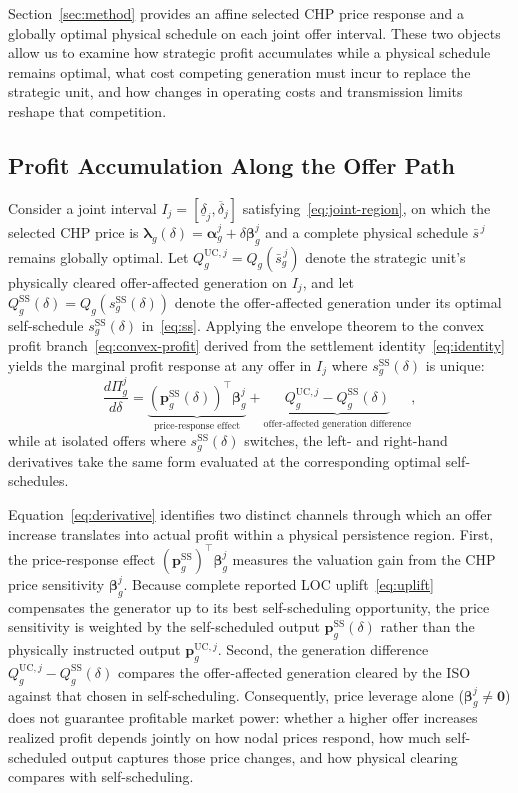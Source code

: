 \documentclass[journal]{IEEEtran}
\newcommand{\bp}{\bm p}
\newcommand{\blambda}{\bm\lambda}
\newcommand{\UC}{\mathrm{UC}}
\newcommand{\SSched}{\mathrm{SS}}
\begin{document}
Section~\ref{sec:method} provides an affine selected CHP price response and a globally optimal physical schedule on each joint offer interval. These two objects allow us to examine how strategic profit accumulates while a physical schedule remains optimal, what cost competing generation must incur to replace the strategic unit, and how changes in operating costs and transmission limits reshape that competition.

\subsection{Profit Accumulation Along the Offer Path}

Consider a joint interval $I_j=[\underline{\delta}_j,\overline{\delta}_j]$ satisfying~\eqref{eq:joint-region}, on which the selected CHP price is $\blambda_g(\delta)=\bm{\alpha}_g^j+\delta\bm{\beta}_g^j$ and a complete physical schedule $\bar{s}^{\,j}$ remains globally optimal. Let $Q_g^{\UC,j}=Q_g(\bar{s}_g^{\,j})$ denote the strategic unit's physically cleared offer-affected generation on $I_j$, and let $Q_g^{\SSched}(\delta)=Q_g(s_g^{\SSched}(\delta))$ denote the offer-affected generation under its optimal self-schedule $s_g^{\SSched}(\delta)$ in~\eqref{eq:ss}. Applying the envelope theorem to the convex profit branch~\eqref{eq:convex-profit} derived from the settlement identity~\eqref{eq:identity} yields the marginal profit response at any offer in $I_j$ where $s_g^{\SSched}(\delta)$ is unique:
\begin{equation}
\frac{d\Pi_g^j}{d\delta}
=
\underbrace{(\bp_g^{\SSched}(\delta))^\top\bm{\beta}_g^j}_{\text{price-response effect}}
+
\underbrace{Q_g^{\UC,j} - Q_g^{\SSched}(\delta)}_{\text{offer-affected generation difference}},
\label{eq:derivative}
\end{equation}
while at isolated offers where $s_g^{\SSched}(\delta)$ switches, the left- and right-hand derivatives take the same form evaluated at the corresponding optimal self-schedules.

Equation~\eqref{eq:derivative} identifies two distinct channels through which an offer increase translates into actual profit within a physical persistence region. First, the price-response effect $(\bp_g^{\SSched})^\top\bm{\beta}_g^j$ measures the valuation gain from the CHP price sensitivity $\bm{\beta}_g^j$. Because complete reported LOC uplift~\eqref{eq:uplift} compensates the generator up to its best self-scheduling opportunity, the price sensitivity is weighted by the self-scheduled output $\bp_g^{\SSched}(\delta)$ rather than the physically instructed output $\bp_g^{\UC,j}$. Second, the generation difference $Q_g^{\UC,j}-Q_g^{\SSched}(\delta)$ compares the offer-affected generation cleared by the ISO against that chosen in self-scheduling. Consequently, price leverage alone ($\bm{\beta}_g^j\neq\bm{0}$) does not guarantee profitable market power: whether a higher offer increases realized profit depends jointly on how nodal prices respond, how much self-scheduled output captures those price changes, and how physical clearing compares with self-scheduling.
\end{document}
